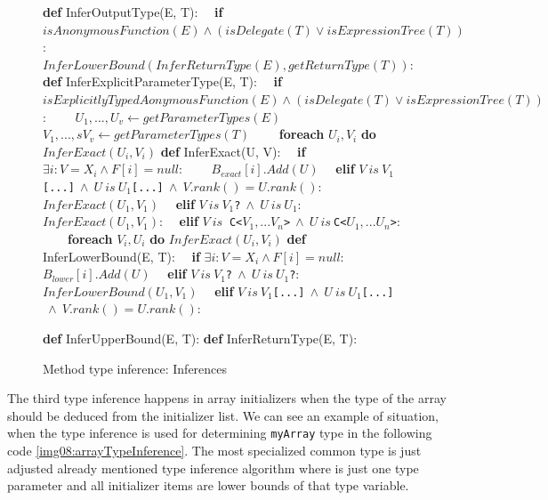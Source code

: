 \begin{figure}
\begin{framed}
\begin{algorithmic}[1]
\State \textbf{def} InferOutputType(E, T):
\State \ \ \textbf{if} $isAnonymousFunction(E) \wedge (isDelegate(T) \vee isExpressionTree(T))$:
\State \ \ \ \ $InferLowerBound(InferReturnType(E), getReturnType(T))$:
\State \textbf{def} InferExplicitParameterType(E, T):
\State \ \ \textbf{if} $isExplicitlyTypedAonymousFunction(E) \wedge (isDelegate(T) \vee isExpressionTree(T))$:
\State \ \ \ \ $U_1, ..., U_v \gets getParameterTypes(E)$
\State \ \ \ \ $V_1, ...,s V_v \gets getParameterTypes(T)$
\State \ \ \ \ \textbf{foreach} $U_i, V_i$ \textbf{do} $InferExact(U_i, V_i)$ 
\State \textbf{def} InferExact(U, V):
\State \ \ \textbf{if} $\exists i : V = X_i \wedge F[i] = null$:
\State \ \ \ \ $B_{exact}[i].Add(U)$
\State \ \ \textbf{elif} $V\ is\ $\texttt{$V_1$[...]}$\ \wedge\ U\ is\ $\texttt{$U_1$[...]}$\ \wedge\ V.rank() = U.rank()$:
\State \ \ \ \ $InferExact(U_1, V_1)$
\State \ \ \textbf{elif} $V\ is\ $\texttt{$V_1$?}$\ \wedge\ U\ is\ $\texttt{$U_1$}:
\State \ \ $InferExact(U_1, V_1)$:
\State \ \ \textbf{elif} $V\ is\ $ \texttt{C<$V_1,...V_n$>}$\ \wedge\ U\ is\ $\texttt{C<$U_1,...U_n$>}:
\State \ \ \ \ \textbf{foreach} $V_i, U_i$ \textbf{do} $InferExact(U_i, V_i)$
\State \textbf{def} InferLowerBound(E, T):
\State \ \ \textbf{if} $\exists i : V = X_i \wedge F[i] = null$:
\State \ \ \ \ $B_{lower}[i].Add(U)$
\State \ \ \textbf{elif} $V\ is\ $\texttt{$V_1$?}$\ \wedge\ U\ is\ $\texttt{$U_1$?}:
\State \ \ \ \ $InferLowerBound(U_1, V_1)$
\State \ \ \textbf{elif} $V\ is\ $\texttt{$V_1$[...]}$\ \wedge\ U\ is\ $\texttt{$U_1$[...]}$\ \wedge\ V.rank() = U.rank()$:




\State \textbf{def} InferUpperBound(E, T):
\State \textbf{def} InferReturnType(E, T):
\end{algorithmic}
\end{framed}
\caption{Method type inference: Inferences}
\end{figure}
\par
{}
The third type inference happens in array initializers when the type of the array should be deduced from the initializer list.
We can see an example of situation, when the type inference is used for determining \texttt{myArray} type in the following code \ref{img08:arrayTypeInference}.
The most specialized common type is just adjusted already mentioned type inference algorithm where is just one type parameter and all initializer items are lower bounds of that type variable.
